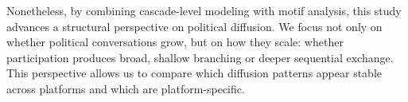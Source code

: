 \documentclass[letterpaper]{article} %
\newcommand{\cb}[1]{\textcolor{blue}{CB: #1}}
\begin{document}
Nonetheless, by combining cascade-level modeling with motif analysis, this study advances a structural perspective on political diffusion. We focus not only on whether political conversations grow, but on how they scale: whether participation produces broad, shallow branching or deeper sequential exchange. This perspective allows us to compare which diffusion patterns appear stable across platforms and which are platform-specific. 




\end{document}
